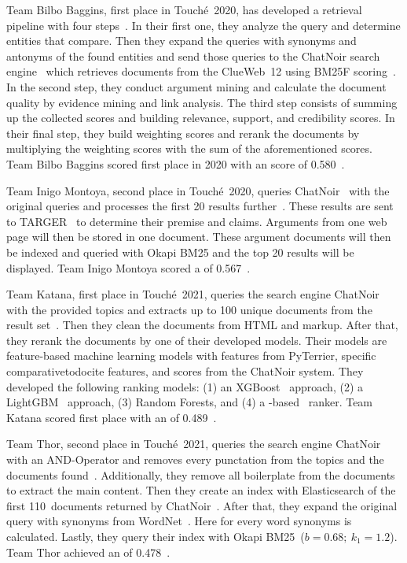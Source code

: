 Team Bilbo Baggins, first place in Touché~2020, has developed a retrieval pipeline with four steps~\cite{AbyeST2020}.
In their first one, they analyze the query and determine entities that compare.
Then they expand the queries with synonyms and antonyms of the found entities and send those queries to the ChatNoir search engine~\cite{BevendorffSHP2018} which retrieves documents from the ClueWeb~12 using BM25F scoring~\cite{PotthastHSGMTW2012}.
In the second step, they conduct argument mining and calculate the document quality by evidence mining and link analysis.
The third step consists of summing up the collected scores and building relevance, support, and credibility scores.
In their final step, they build weighting scores and rerank the documents by multiplying the weighting scores with the sum of the aforementioned scores.
Team Bilbo Baggins scored first place in 2020 with an  score of 0.580~\cite{AbyeST2020}.

Team Inigo Montoya, second place in Touché~2020, queries ChatNoir~\cite{BevendorffSHP2018} with the original queries and processes the first 20 results further~\cite{Huck2020}.
These results are sent to TARGER~\cite{ChernodubOHBHBP2019} to determine their premise and claims.
Arguments from one web page will then be stored in one document.
These argument documents will then be indexed and queried with Okapi BM25 and the top 20 results will be displayed.
Team Inigo Montoya scored a  of 0.567~\cite{Huck2020}.

Team Katana, first place in Touché~2021, queries the search engine ChatNoir~\cite{BevendorffSHP2018} with the provided topics and extracts up to 100 unique documents from the result set~\cite{ChekalinaP2021}.
Then they clean the documents from HTML and markup.
After that, they rerank the documents by one of their developed models.
Their models are feature-based machine learning models with features from PyTerrier, specific comparativetodocite features, and scores from the ChatNoir system. They developed the following ranking models:
(1) an XGBoost~\cite{ChenG2016} approach, (2) a LightGBM~\cite{KeMFWCMYL2017} approach, (3) Random Forests, and (4) a \Bert-based~\cite{DevlinCLT2019} ranker.
Team Katana scored first place with an  of 0.489~\cite{ChekalinaP2021}.

Team Thor, second place in Touché~2021, queries the search engine ChatNoir with an AND-Operator and removes every punctation from the topics and the documents found~\cite{ShirshakovaW2021}.
Additionally, they remove all boilerplate from the documents to extract the main content.
Then they create an index with Elasticsearch of the first 110~documents returned by ChatNoir~\cite{BevendorffSHP2018}.
After that, they expand the original query with synonyms from WordNet~\cite{Miller1992}.
Here for every word synonyms is calculated.
Lastly, they query their index with Okapi BM25~(\( b = 0.68;~k_1 = 1.2 \)).
Team Thor achieved an  of 0.478~\cite{ShirshakovaW2021}.

